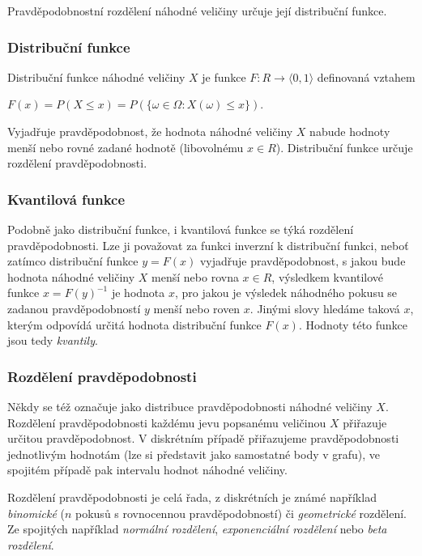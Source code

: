 \documentclass[thesis=M,czech]{FITthesis}[2014/05/07]
\begin{document}
Pravděpodobnostní rozdělení náhodné veličiny určuje její distribuční funkce. 

\subsubsection{Distribuční funkce}
\label{cdf}
Distribuční funkce náhodné veličiny $X$ je funkce $F: R \to \langle0,1\rangle$ definovaná vztahem 

\begin{center}
$F(x) = P(X \leq x) = P(\{ \omega \in \Omega: X(\omega) \leq x \})$.
\end{center}

Vyjadřuje pravděpodobnost, že hodnota náhodné veličiny $X$ nabude hodnoty menší nebo rovné zadané hodnotě (libovolnému $x \in R$). Distribuční funkce určuje rozdělení pravděpodobnosti.

\subsubsection{Kvantilová funkce}
\label{icdf}
\cite{pst2} Podobně jako distribuční funkce, i kvantilová funkce se týká rozdělení pravděpodobnosti. Lze ji považovat za funkci inverzní k distribuční funkci, neboť zatímco distribuční funkce $y = F(x)$ vyjadřuje pravděpodobnost, s jakou bude hodnota náhodné veličiny $X$ menší nebo rovna $x \in R$, výsledkem kvantilové funkce $x = F(y)^{-1}$ je hodnota $x$, pro jakou je výsledek náhodného pokusu se zadanou pravděpodobností $y$ menší nebo roven $x$. Jinými slovy hledáme taková $x$, kterým odpovídá určitá hodnota distribuční funkce $F(x)$. Hodnoty této funkce jsou tedy \emph{kvantily}.

\subsubsection{Rozdělení pravděpodobnosti}
\label{distr}
Někdy se též označuje jako distribuce pravděpodobnosti náhodné veličiny $X$. 
Rozdělení pravděpodobnosti každému jevu popsanému veličinou $X$ přiřazuje určitou pravděpodobnost. V diskrétním případě přiřazujeme pravděpodobnosti jednotlivým hodnotám (lze si představit jako samostatné body v grafu), ve spojitém případě pak intervalu hodnot náhodné veličiny. 

Rozdělení pravděpodobnosti je celá řada, z diskrétních je známé například \emph{binomické} ($n$ pokusů s rovnocennou pravděpodobností) či \emph{geometrické} rozdělení. Ze spojitých například \emph{normální rozdělení}, \emph{exponenciální rozdělení} nebo \emph{beta rozdělení}.
\end{document}
